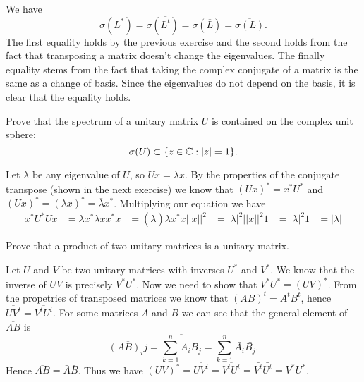 \documentclass{article}
\begin{document}
\begin{solution}
  We have
  \[\sigma(L^*) = \sigma(\overline{L^t}) = \sigma(\overline{L}) = \overline{\sigma(L)}.\]
  The first equality holds by the previous exercise and the second holds from the fact that transposing a matrix doesn't change the eigenvalues.
  The finally equality stems from the fact that taking the complex conjugate of a matrix is the same as a change of basis.
  Since the eigenvalues do not depend on the basis, it is clear that the equality holds.
\end{solution}

\begin{problem}
  Prove that the spectrum of a unitary matrix $U$ is contained on the complex unit sphere:
  \[\sigma(U) \subset \{z \in \mathbb{C} : |z| = 1\}.\]
\end{problem}

\begin{solution}
  Let $\lambda$ be any eigenvalue of $U$, so $U x = \lambda x$.
  By the properties of the conjugate transpose (shown in the next exercise) we know that $(U x)^* = x^* U^*$ and $(U x)^* = (\lambda x)^* = \overline{\lambda} x^*$.
  Multiplying our equation we have
  \[\begin{aligned}
    x^* U^* U x &= \overline{\lambda} x^* \lambda x
    x^* x &= (\overline{\lambda}) \lambda x^* x
    ||x||^2 &= |\lambda|^2 ||x||^2
    1 &= |\lambda|^2
    1 &= |\lambda|
  \end{aligned}\]
\end{solution}

\begin{problem}
  Prove that a product of two unitary matrices is a unitary matrix.
\end{problem}

\begin{solution}
  Let $U$ and $V$ be two unitary matrices with inverses $U^*$ and $V^*$.
  We know that the inverse of $UV$ is precisely $V^* U^*$.
  Now we need to show that $V^* U^* = (UV)^*$.
  From the propetries of transposed matrices we know that $(AB)^t = A^t B^t$, hence $\overline{UV^t} = \overline{V^t U^t}$.
  For some matrices $A$ and $B$ we can see that the general element of $\overline{AB}$ is
  \[\overline{(AB)_ij} = \overline{\sum_{k=1}^{n} A_i B_j} = \sum_{k=1}^{n} \bar{A_i} \bar{B_j}.\]
  Hence $\overline{AB} = \bar{A} \bar{B}$.
  Thus we have $(UV)^* = \overline{UV^t} = \overline{V^t U^t} = \bar{V^t} \bar{U^t} = V^* U^*$.
\end{solution}
\end{document}

